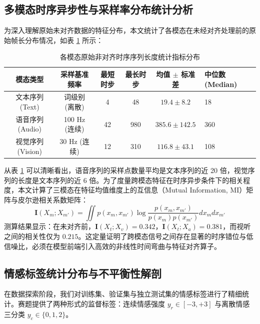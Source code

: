 \subsection{多模态时序异步性与采样率分布统计分析}
为深入理解原始未对齐数据的特征分布，本文统计了各模态在未经对齐处理前的原始帧长分布情况，如表 \ref{tab:seq_len_stats} 所示：

\begin{table}[htp!]
\centering
\small
\renewcommand\arraystretch{1.3}
\caption{各模态原始非对齐时序序列长度统计指标分布}
\label{tab:seq_len_stats}
\begin{tabularx}{0.9\textwidth}{|c|c|c|c|c|X|}
\hline
\textbf{模态类型} & \textbf{采样基准频率} & \textbf{最短时步} & \textbf{最长时步} & \textbf{均值 $\pm$ 标准差} & \textbf{中位数 (Median)} \\ \hline
文本序列 (Text) & 词级别 (离散) & 4 & 48 & $19.4 \pm 8.2$ & 18 \\ \hline
语音序列 (Audio) & 100 Hz (连续) & 42 & 980 & $385.6 \pm 142.5$ & 360 \\ \hline
视觉序列 (Vision) & 30 Hz (连续) & 12 & 310 & $116.8 \pm 43.1$ & 108 \\ \hline
\end{tabularx}
\end{table}

从表 \ref{tab:seq_len_stats} 可以清晰看出，语音序列的采样点数量平均是文本序列的近 20 倍，视觉序列的长度是文本序列的近 6 倍。为了度量跨模态特征在时序异步条件下的相关程度，本文计算了三模态在特征均值维度上的互信息（Mutual Information, MI）矩阵与皮尔逊相关系数矩阵：
\begin{equation}
\mathbf{I}(X_m; X_{m'}) = \iint p(x_m, x_{m'}) \log \frac{p(x_m, x_{m'})}{p(x_m)p(x_{m'})} dx_m dx_{m'}
\end{equation}
测算结果显示：在未对齐前，$\mathbf{I}(X_t; X_v) = 0.342$，$\mathbf{I}(X_t; X_a) = 0.381$，而视听之间的相关性仅为 $0.215$。这定量证明了跨模态信号之间存在显著的时序错位与低信噪比，必须在模型前端引入高效的非线性时间弯曲与特征对齐算子。

\subsection{情感标签统计分布与不平衡性解剖}
在数据探索阶段，我们对训练集、验证集与独立测试集的情感标签进行了精细统计。赛题提供了两种形式的监督标签：连续情感强度 $y_r \in [-3, +3]$ 与离散情感三分类 $y_c \in \{0, 1, 2\}$。

